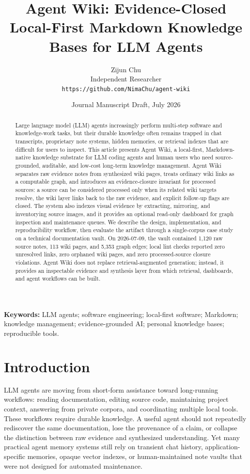 \documentclass[11pt]{article}
\title{Agent Wiki: Evidence-Closed Local-First Markdown Knowledge Bases for LLM Agents}
\author{Zijun Chu\\
Independent Researcher\\
\texttt{https://github.com/NimaChu/agent-wiki}}
\date{Journal Manuscript Draft, July 2026}
\begin{document}
\maketitle

\begin{abstract}
Large language model (LLM) agents increasingly perform multi-step software and
knowledge-work tasks, but their durable knowledge often remains trapped in chat
transcripts, proprietary note systems, hidden memories, or retrieval indexes
that are difficult for users to inspect. This article presents Agent Wiki, a
local-first, Markdown-native knowledge substrate for LLM coding agents and
human users who need source-grounded, auditable, and low-cost long-term
knowledge management. Agent Wiki separates raw evidence notes from synthesized
wiki pages, treats ordinary wiki links as a computable graph, and introduces an
evidence-closure invariant for processed sources: a source can be considered
processed only when its related wiki targets resolve, the wiki layer links back
to the raw evidence, and explicit follow-up flags are closed. The system also
indexes visual evidence by extracting, mirroring, and inventorying source
images, and it provides an optional read-only dashboard for graph inspection and
maintenance queues. We describe the design, implementation, and reproducibility
workflow, then evaluate the artifact through a single-corpus case study on a
technical documentation vault. On 2026-07-09, the vault contained 1,120 raw
source notes, 113 wiki pages, and 5,353 graph edges; local lint checks reported
zero unresolved links, zero orphaned wiki pages, and zero processed-source
closure violations. Agent Wiki does not replace retrieval-augmented generation;
instead, it provides an inspectable evidence and synthesis layer from which
retrieval, dashboards, and agent workflows can be built.
\end{abstract}

\noindent\textbf{Keywords:}
LLM agents; software engineering; local-first software; Markdown; knowledge
management; evidence-grounded AI; personal knowledge bases; reproducible tools.

\section{Introduction}

LLM agents are moving from short-form assistance toward long-running workflows:
reading documentation, editing source code, maintaining project context,
answering from private corpora, and coordinating multiple local tools. These
workflows require durable knowledge. A useful agent should not repeatedly
rediscover the same documentation, lose the provenance of a claim, or collapse
the distinction between raw evidence and synthesized understanding. Yet many
practical agent memory systems still rely on transient chat history,
application-specific memories, opaque vector indexes, or human-maintained note
vaults that were not designed for automated maintenance.
\end{document}
